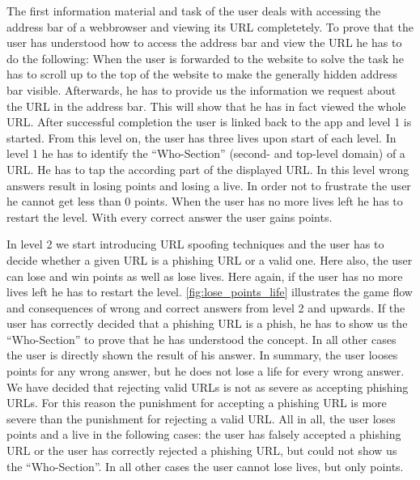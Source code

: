 \begin{description}[leftmargin=0cm]
	\item[Basic Knowledge]  The first information material and task of the user deals with accessing the address bar of a webbrowser and viewing its URL completetely.
 To prove that the user has understood how to access the address bar and view the URL he has to do the following: When the user is forwarded to the website to solve the task he has to scroll up to the top of the website to make the generally hidden address bar visible.
 Afterwards, he has to provide us the information we request about the URL in the address bar.
 This will show that he has in fact viewed the whole URL.
 After successful completion the user is linked back to the app and level 1 is started.
 From this level on, the user has three lives upon start of each level.
 In level 1 he has to identify the ``Who-Section'' (second- and top-level domain) of a URL.
 He has to tap the according part of the displayed URL.
 In this level wrong answers result in losing points and losing a live.
 In order not to frustrate the user he cannot get less than 0 points.
 When the user has no more lives left he has to restart the level.
 With every correct answer the user gains points.
	\item[Actual Game]  In level 2 we start introducing URL spoofing techniques and the user has to decide whether a given URL is a phishing URL or a valid one.
 Here also, the user can lose and win points as well as lose lives.
 Here again, if the user has no more lives left he has to restart the level.
\autoref{fig:lose_points_life} illustrates the game flow and consequences of wrong and correct answers from level 2 and upwards.
 If the user has correctly decided that a phishing URL is a phish, he has to show us the ``Who-Section'' to prove that he has understood the concept.
 In all other cases the user is directly shown the result of his answer.
 In summary, the user looses points for any wrong answer, but he does not lose a life for every wrong answer.
 We have decided that rejecting valid URLs is not as severe as accepting phishing URLs.
 For this reason the punishment for accepting a phishing URL is more severe than the punishment for rejecting a valid URL.
 All in all, the user loses points and a live in the following cases: the user has falsely accepted a phishing URL or the user has correctly rejected a phishing URL, but could not show us the ``Who-Section''. In all other cases the user cannot lose lives, but only points.
\end{description}


